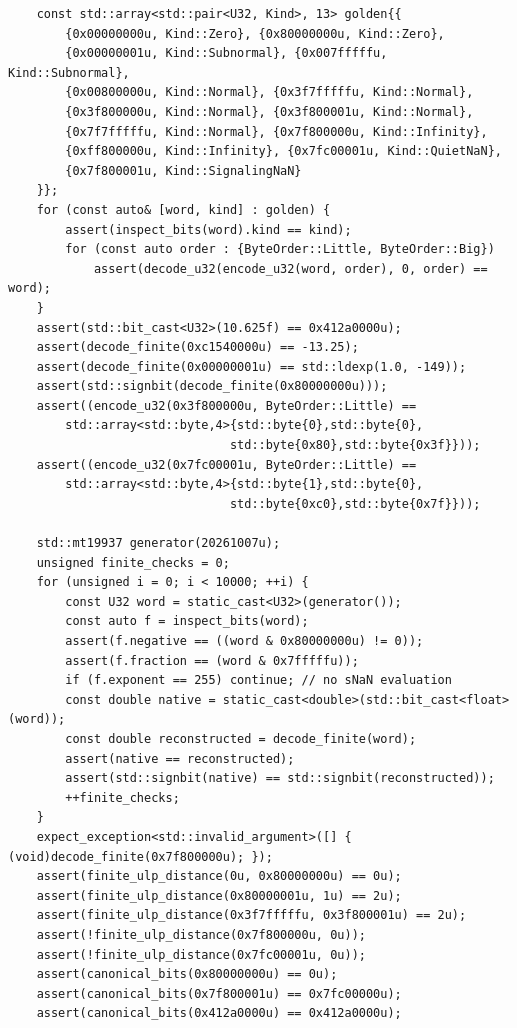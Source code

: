 \begin{verbatim}
    const std::array<std::pair<U32, Kind>, 13> golden{{
        {0x00000000u, Kind::Zero}, {0x80000000u, Kind::Zero},
        {0x00000001u, Kind::Subnormal}, {0x007fffffu, Kind::Subnormal},
        {0x00800000u, Kind::Normal}, {0x3f7fffffu, Kind::Normal},
        {0x3f800000u, Kind::Normal}, {0x3f800001u, Kind::Normal},
        {0x7f7fffffu, Kind::Normal}, {0x7f800000u, Kind::Infinity},
        {0xff800000u, Kind::Infinity}, {0x7fc00001u, Kind::QuietNaN},
        {0x7f800001u, Kind::SignalingNaN}
    }};
    for (const auto& [word, kind] : golden) {
        assert(inspect_bits(word).kind == kind);
        for (const auto order : {ByteOrder::Little, ByteOrder::Big})
            assert(decode_u32(encode_u32(word, order), 0, order) == word);
    }
    assert(std::bit_cast<U32>(10.625f) == 0x412a0000u);
    assert(decode_finite(0xc1540000u) == -13.25);
    assert(decode_finite(0x00000001u) == std::ldexp(1.0, -149));
    assert(std::signbit(decode_finite(0x80000000u)));
    assert((encode_u32(0x3f800000u, ByteOrder::Little) ==
        std::array<std::byte,4>{std::byte{0},std::byte{0},
                               std::byte{0x80},std::byte{0x3f}}));
    assert((encode_u32(0x7fc00001u, ByteOrder::Little) ==
        std::array<std::byte,4>{std::byte{1},std::byte{0},
                               std::byte{0xc0},std::byte{0x7f}}));

    std::mt19937 generator(20261007u);
    unsigned finite_checks = 0;
    for (unsigned i = 0; i < 10000; ++i) {
        const U32 word = static_cast<U32>(generator());
        const auto f = inspect_bits(word);
        assert(f.negative == ((word & 0x80000000u) != 0));
        assert(f.fraction == (word & 0x7fffffu));
        if (f.exponent == 255) continue; // no sNaN evaluation
        const double native = static_cast<double>(std::bit_cast<float>(word));
        const double reconstructed = decode_finite(word);
        assert(native == reconstructed);
        assert(std::signbit(native) == std::signbit(reconstructed));
        ++finite_checks;
    }
    expect_exception<std::invalid_argument>([] { (void)decode_finite(0x7f800000u); });
    assert(finite_ulp_distance(0u, 0x80000000u) == 0u);
    assert(finite_ulp_distance(0x80000001u, 1u) == 2u);
    assert(finite_ulp_distance(0x3f7fffffu, 0x3f800001u) == 2u);
    assert(!finite_ulp_distance(0x7f800000u, 0u));
    assert(!finite_ulp_distance(0x7fc00001u, 0u));
    assert(canonical_bits(0x80000000u) == 0u);
    assert(canonical_bits(0x7f800001u) == 0x7fc00000u);
    assert(canonical_bits(0x412a0000u) == 0x412a0000u);


\end{verbatim}
